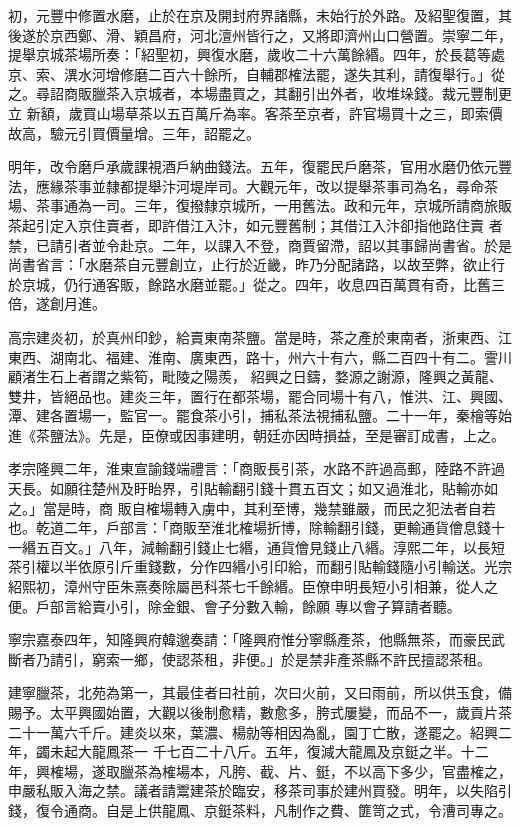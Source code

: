 \begin{pinyinscope}
 初，元豐中修置水磨，止於在京及開封府界諸縣，未始行於外路。及紹聖復置，其後遂於京西鄭、滑、穎昌府，河北澶州皆行之，又將即濟州山口營置。崇寧二年，提舉京城茶場所奏：「紹聖初，興復水磨，歲收二十六萬餘緡。四年，於長葛等處京、索、潩水河增修磨二百六十餘所，自輔郡榷法罷，遂失其利，請復舉行。」從之。尋詔商販臘茶入京城者，本場盡買之，其翻引出外者，收堆垛錢。裁元豐制更立
 新額，歲買山場草茶以五百萬斤為率。客茶至京者，許官場買十之三，即索價故高，驗元引買價量增。三年，詔罷之。



 明年，改令磨戶承歲課視酒戶納曲錢法。五年，復罷民戶磨茶，官用水磨仍依元豐法，應緣茶事並隸都提舉汴河堤岸司。大觀元年，改以提舉茶事司為名，尋命茶場、茶事通為一司。三年，復撥隸京城所，一用舊法。政和元年，京城所請商旅販茶起引定入京住賣者，即許借江入汴，如元豐舊制；其借江入汴卻指他路住賣
 者禁，已請引者並令赴京。二年，以課入不登，商賈留滯，詔以其事歸尚書省。於是尚書省言：「水磨茶自元豐創立，止行於近畿，昨乃分配諸路，以故至弊，欲止行於京城，仍行通客販，餘路水磨並罷。」從之。四年，收息四百萬貫有奇，比舊三倍，遂創月進。



 高宗建炎初，於真州印鈔，給賣東南茶鹽。當是時，茶之產於東南者，浙東西、江東西、湖南北、福建、淮南、廣東西，路十，州六十有六，縣二百四十有二。霅川顧渚生石上者謂之紫筍，毗陵之陽羨，
 紹興之日鑄，婺源之謝源，隆興之黃龍、雙井，皆絕品也。建炎三年，置行在都茶場，罷合同場十有八，惟洪、江、興國、潭、建各置場一，監官一。罷食茶小引，捕私茶法視捕私鹽。二十一年，秦檜等始進《茶鹽法》。先是，臣僚或因事建明，朝廷亦因時損益，至是審訂成書，上之。



 孝宗隆興二年，淮東宣諭錢端禮言：「商販長引茶，水路不許過高郵，陸路不許過天長。如願往楚州及盱眙界，引貼輸翻引錢十貫五百文；如又過淮北，貼輸亦如之。」當是時，商
 販自榷場轉入虜中，其利至博，幾禁雖嚴，而民之犯法者自若也。乾道二年，戶部言：「商販至淮北榷場折博，除輸翻引錢，更輸通貨儈息錢十一緡五百文。」八年，減輸翻引錢止七緡，通貨儈見錢止八緡。淳熙二年，以長短茶引權以半依原引斤重錢數，分作四緡小引印給，而翻引貼輸錢隨小引輸送。光宗紹熙初，漳州守臣朱熹奏除屬邑科茶七千餘緡。臣僚申明長短小引相兼，從人之便。戶部言給賣小引，除金銀、會子分數入輸，餘願
 專以會子算請者聽。



 寧宗嘉泰四年，知隆興府韓邈奏請：「隆興府惟分寧縣產茶，他縣無茶，而豪民武斷者乃請引，窮索一鄉，使認茶租，非便。」於是禁非產茶縣不許民擅認茶租。



 建寧臘茶，北苑為第一，其最佳者曰社前，次曰火前，又曰雨前，所以供玉食，備賜予。太平興國始置，大觀以後制愈精，數愈多，胯式屢變，而品不一，歲貢片茶二十一萬六千斤。建炎以來，葉濃、楊勍等相因為亂，園丁亡散，遂罷之。紹興二年，蠲未起大龍鳳茶一
 千七百二十八斤。五年，復減大龍鳳及京鋌之半。十二年，興榷場，遂取臘茶為榷場本，凡胯、截、片、鋌，不以高下多少，官盡榷之，申嚴私販入海之禁。議者請鬻建茶於臨安，移茶司事於建州買發。明年，以失陷引錢，復令通商。自是上供龍鳳、京鋌茶料，凡制作之費、篚笥之式，令漕司專之。




\end{pinyinscope}
